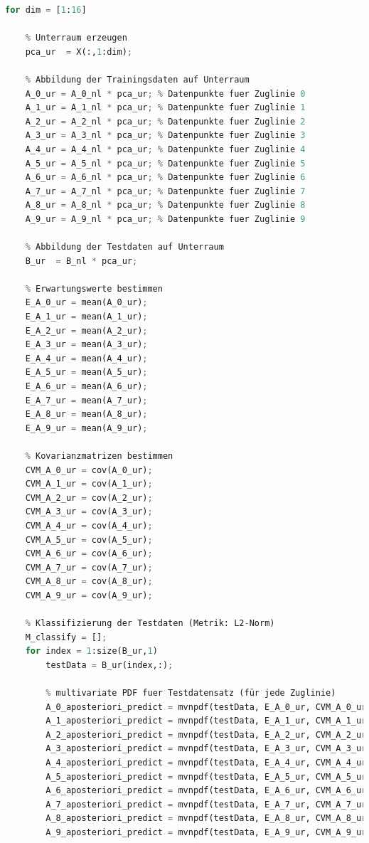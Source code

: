 \documentclass[12pt]{article}
\begin{document}
\begin{lstlisting}[language=Python]
for dim = [1:16]

    % Unterraum erzeugen
    pca_ur  = X(:,1:dim);
    
    % Abbildung der Trainingsdaten auf Unterraum
    A_0_ur = A_0_nl * pca_ur; % Datenpunkte fuer Zuglinie 0
    A_1_ur = A_1_nl * pca_ur; % Datenpunkte fuer Zuglinie 1
    A_2_ur = A_2_nl * pca_ur; % Datenpunkte fuer Zuglinie 2
    A_3_ur = A_3_nl * pca_ur; % Datenpunkte fuer Zuglinie 3
    A_4_ur = A_4_nl * pca_ur; % Datenpunkte fuer Zuglinie 4
    A_5_ur = A_5_nl * pca_ur; % Datenpunkte fuer Zuglinie 5
    A_6_ur = A_6_nl * pca_ur; % Datenpunkte fuer Zuglinie 6
    A_7_ur = A_7_nl * pca_ur; % Datenpunkte fuer Zuglinie 7
    A_8_ur = A_8_nl * pca_ur; % Datenpunkte fuer Zuglinie 8
    A_9_ur = A_9_nl * pca_ur; % Datenpunkte fuer Zuglinie 9
    
    % Abbildung der Testdaten auf Unterraum
    B_ur  = B_nl * pca_ur;
    
    % Erwartungswerte bestimmen
    E_A_0_ur = mean(A_0_ur);
    E_A_1_ur = mean(A_1_ur);
    E_A_2_ur = mean(A_2_ur);
    E_A_3_ur = mean(A_3_ur);
    E_A_4_ur = mean(A_4_ur);
    E_A_5_ur = mean(A_5_ur);
    E_A_6_ur = mean(A_6_ur);
    E_A_7_ur = mean(A_7_ur);
    E_A_8_ur = mean(A_8_ur);
    E_A_9_ur = mean(A_9_ur);
    
    % Kovarianzmatrizen bestimmen
    CVM_A_0_ur = cov(A_0_ur);
    CVM_A_1_ur = cov(A_1_ur);
    CVM_A_2_ur = cov(A_2_ur);
    CVM_A_3_ur = cov(A_3_ur);
    CVM_A_4_ur = cov(A_4_ur);
    CVM_A_5_ur = cov(A_5_ur);
    CVM_A_6_ur = cov(A_6_ur);
    CVM_A_7_ur = cov(A_7_ur);
    CVM_A_8_ur = cov(A_8_ur);
    CVM_A_9_ur = cov(A_9_ur);
    
    % Klassifizierung der Testdaten (Metrik: L2-Norm)
    M_classify = [];
    for index = 1:size(B_ur,1)
        testData = B_ur(index,:);
    
        % multivariate PDF fuer Testdatensatz (für jede Zuglinie)
        A_0_aposteriori_predict = mvnpdf(testData, E_A_0_ur, CVM_A_0_ur) * A_x_apriori;
        A_1_aposteriori_predict = mvnpdf(testData, E_A_1_ur, CVM_A_1_ur) * A_x_apriori;
        A_2_aposteriori_predict = mvnpdf(testData, E_A_2_ur, CVM_A_2_ur) * A_x_apriori;
        A_3_aposteriori_predict = mvnpdf(testData, E_A_3_ur, CVM_A_3_ur) * A_x_apriori;
        A_4_aposteriori_predict = mvnpdf(testData, E_A_4_ur, CVM_A_4_ur) * A_x_apriori;
        A_5_aposteriori_predict = mvnpdf(testData, E_A_5_ur, CVM_A_5_ur) * A_x_apriori;
        A_6_aposteriori_predict = mvnpdf(testData, E_A_6_ur, CVM_A_6_ur) * A_x_apriori;
        A_7_aposteriori_predict = mvnpdf(testData, E_A_7_ur, CVM_A_7_ur) * A_x_apriori;
        A_8_aposteriori_predict = mvnpdf(testData, E_A_8_ur, CVM_A_8_ur) * A_x_apriori;
        A_9_aposteriori_predict = mvnpdf(testData, E_A_9_ur, CVM_A_9_ur) * A_x_apriori;
    

\end{lstlisting}
\end{document}
